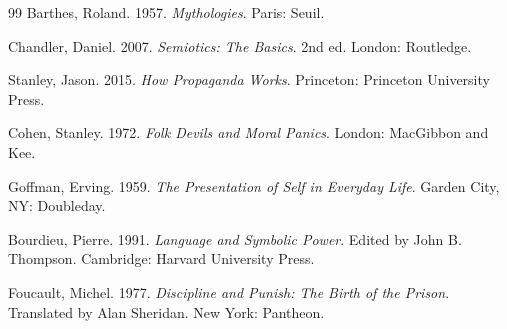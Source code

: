\documentclass[12pt,a4paper]{article}
\begin{document}
\begin{thebibliography}{99}
Barthes, Roland. 1957. \emph{Mythologies}. Paris: Seuil.

Chandler, Daniel. 2007. \emph{Semiotics: The Basics}. 2nd ed. London: Routledge.

Stanley, Jason. 2015. \emph{How Propaganda Works}. Princeton: Princeton University Press.

Cohen, Stanley. 1972. \emph{Folk Devils and Moral Panics}. London: MacGibbon and Kee.

Goffman, Erving. 1959. \emph{The Presentation of Self in Everyday Life}. Garden City, NY: Doubleday.

Bourdieu, Pierre. 1991. \emph{Language and Symbolic Power}. Edited by John B. Thompson. Cambridge: Harvard University Press.

Foucault, Michel. 1977. \emph{Discipline and Punish: The Birth of the Prison}. Translated by Alan Sheridan. New York: Pantheon.

\end{thebibliography}
\end{document}
